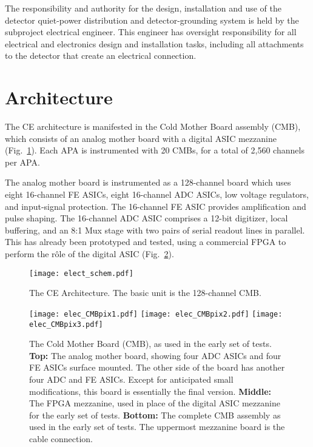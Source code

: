 The responsibility and authority for the design, installation 
and use of the detector quiet-power distribution and 
detector-grounding system is held by the subproject electrical engineer. 
This engineer has oversight responsibility for all electrical and electronics 
design and installation tasks, including all attachments to the detector 
that create an electrical connection. 

%
\section{Architecture}
\label{sec:fe_arch}

The CE architecture is manifested in the Cold Mother Board assembly (CMB),
which consists of an analog mother board with a digital ASIC mezzanine (Fig.~\ref{fig:elect_schem}).
Each APA is instrumented with 20 CMBs, for a total of 2,560 channels per APA.

The analog mother board is instrumented as a 128-channel board which uses eight 16-channel FE ASICs,
eight 16-channel ADC ASICs, low voltage regulators, and input-signal protection.
The 16-channel FE ASIC provides amplification and pulse shaping.
The 16-channel ADC ASIC comprises a 12-bit digitizer, local buffering,
and an 8:1 Mux stage with two pairs of serial readout lines in parallel.
This has already been prototyped and tested,
using a commercial FPGA to perform the r\^ole of the digital ASIC (Fig.~\ref{fig:elec_CMBpix}).

\begin{figure}[htbp]
\centering
\texttt{[image: elect\_schem.pdf]}
\caption{
  The CE Architecture.
  The basic unit is the 128-channel CMB.
}
\label{fig:elect_schem}
\end{figure}

\begin{figure}[htbp]
\centering
\texttt{[image: elec\_CMBpix1.pdf]}
\texttt{[image: elec\_CMBpix2.pdf]}
\texttt{[image: elec\_CMBpix3.pdf]}
\caption{
  The Cold Mother Board (CMB), as used in the early set of tests.
  {\bf Top:} The analog mother board, showing four ADC ASICs and four FE ASICs surface mounted.
  The other side of the board has another four ADC and FE ASICs.
  Except for anticipated small modifications, this board is essentially the final version.
  {\bf Middle:} The FPGA mezzanine, used in place of the digital ASIC mezzanine for the early set of tests.
  {\bf Bottom:} The complete CMB assembly as used in the early set of tests.
  The uppermost mezzanine board is the cable connection.
}
\label{fig:elec_CMBpix}
\end{figure}


